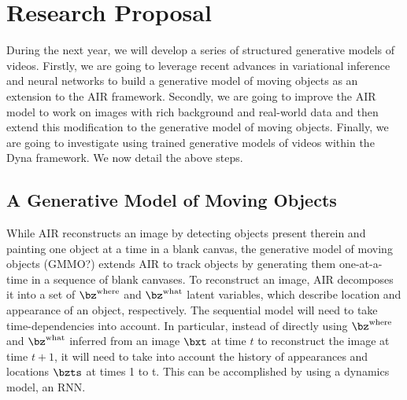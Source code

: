 \section{Research Proposal}
\label{sec:proposal}


    During the next year, we will develop a series of structured generative models of videos.
    Firstly, we are going to leverage recent advances in variational inference and neural networks to build a generative model of moving objects as an extension to the AIR framework. 
    Secondly, we are going to improve the AIR model to work on images with rich background and real-world data and then extend this modification to the generative model of moving objects. 
    Finally, we are going to investigate using trained generative models of videos within the Dyna framework.
    We now detail the above steps.
    
    \subsection{A Generative Model of Moving Objects}
        While AIR reconstructs an image by detecting objects present therein and painting one object at a time in a blank canvas, the generative model of moving objects (GMMO?) extends AIR to track objects by generating them one-at-a-time in a sequence of blank canvases.
        To reconstruct an image, AIR decomposes it into a set of $\bz^{\mathrm{where}}$ and $\bz^{\mathrm{what}}$ latent variables, which describe location and appearance of an object, respectively.
        The sequential model will need to take time-dependencies into account.
        In particular, instead of directly using $\bz^{\mathrm{where}}$ and $\bz^{\mathrm{what}}$ inferred from an image $\bxt$ at time $t$ to reconstruct the image at time $t+1$, it will need to take into account the history of appearances and locations $\bzts$ at times 1 to t.
        This can be accomplished by using a dynamics model, \eg an RNN. 
        
